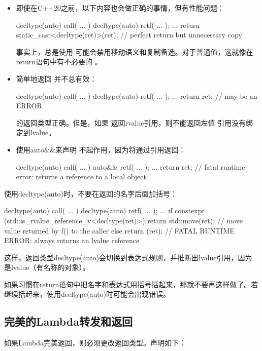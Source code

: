 \begin{itemize}
	\item 即使在C++20之前，以下内容也会做正确的事情，但有性能问题：

\begin{cppcode}
decltype(auto) call( ... )
{
	decltype(auto) ret{f( ... )};
	...
	return static_cast<decltype(ret)>(ret); // perfect return but unnecessary copy
}
\end{cppcode}
事实上，总是使用  可能会禁用移动语义和复制备选。对于普通值，这就像在return语句中有不必要的 。
\item 简单地返回  并不总有效：
\begin{cppcode}
decltype(auto) call( ... )
{
	decltype(auto) ret{f( ... )};
	...
	return ret; // may be an ERROR
}
\end{cppcode}
 的返回类型正确。但是，如果  返回rvalue引用，则不能返回左值  引用没有绑定到lvalue。
\item 使用auto\&\&来声明  不起作用，因为将通过引用返回：
\begin{cppcode}
decltype(auto) call( ... )
{
	auto&& ret{f( ... )};
	...
	return ret; // fatal runtime error: returns a reference to a local object
}
\end{cppcode}
\end{itemize}

使用decltype(auto)时，不要在返回的名字后面加括号：

\begin{cppcode}
decltype(auto) call( ... )
{
	decltype(auto) ret{f( ... )};
	...
	if constexpr (std::is_rvalue_reference_v<decltype(ret)>) {
		return std::move(ret); // move value returned by f() to the caller
	}
	else {
		return (ret); // FATAL RUNTIME ERROR: always returns an lvalue reference
	}
}
\end{cppcode}

这样，返回类型decltype(auto)会切换到表达式规则，并推断出lvalue引用，因为  是lvalue（有名称的对象）。

如果习惯在return语句中把名字和表达式用括号括起来，那就不要再这样做了。若继续括起来，使用decltype(auto)时可能会出现错误。

\subsection{完美的Lambda转发和返回}

如果Lambda完美返回，则必须更改返回类型。声明如下：

